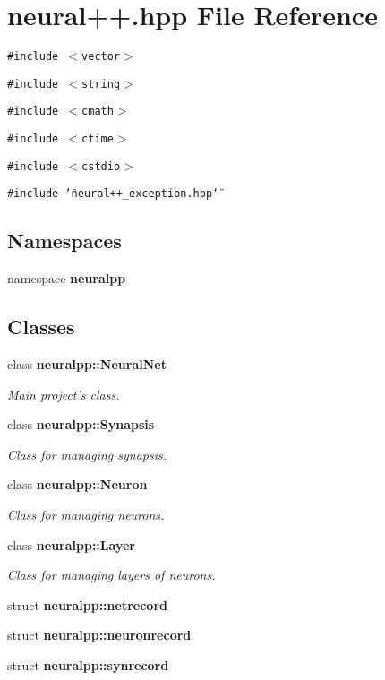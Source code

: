 \section{neural++.hpp File Reference}
\label{neural_09_09_8hpp}
{\tt \#include $<$vector$>$}\par
{\tt \#include $<$string$>$}\par
{\tt \#include $<$cmath$>$}\par
{\tt \#include $<$ctime$>$}\par
{\tt \#include $<$cstdio$>$}\par
{\tt \#include \char`\"{}neural++\_\-exception.hpp\char`\"{}}\par
\subsection*{Namespaces}
\begin{CompactItemize}
\item 
namespace {\bf neuralpp}
\end{CompactItemize}
\subsection*{Classes}
\begin{CompactItemize}
\item 
class {\bf neuralpp::NeuralNet}
\begin{CompactList}\small\item\em Main project's class. \item\end{CompactList}\item 
class {\bf neuralpp::Synapsis}
\begin{CompactList}\small\item\em Class for managing synapsis. \item\end{CompactList}\item 
class {\bf neuralpp::Neuron}
\begin{CompactList}\small\item\em Class for managing neurons. \item\end{CompactList}\item 
class {\bf neuralpp::Layer}
\begin{CompactList}\small\item\em Class for managing layers of neurons. \item\end{CompactList}\item 
struct {\bf neuralpp::netrecord}
\item 
struct {\bf neuralpp::neuronrecord}
\item 
struct {\bf neuralpp::synrecord}
\end{CompactItemize}
